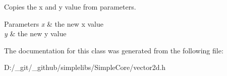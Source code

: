 Copies the x and y value from parameters. 


\begin{DoxyParams}{Parameters}
{\em x} & the new x value \\
\hline
{\em y} & the new y value \\
\hline
\end{DoxyParams}


The documentation for this class was generated from the following file\+:\begin{DoxyCompactItemize}
\item 
D\+:/\+\_\+git/\+\_\+github/simplelibs/\+Simple\+Core/vector2d.\+h\end{DoxyCompactItemize}

